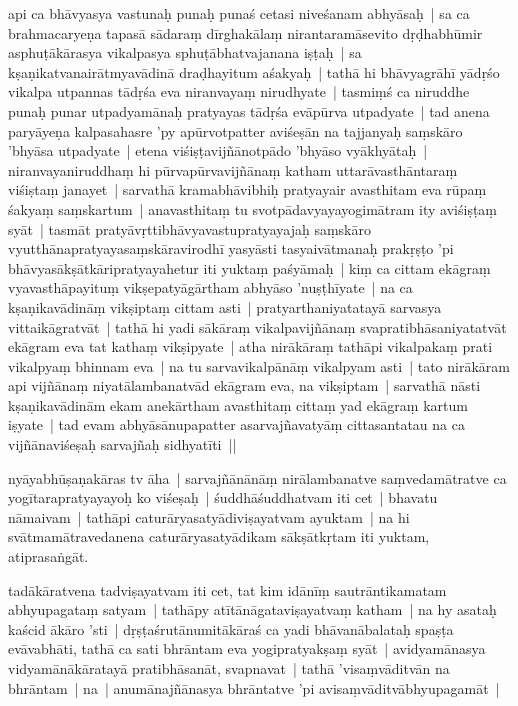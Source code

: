 \documentclass[article,12pt,a4paper]{memoir}%
\newcounter{parCount}
\begin{document}
	  \pstart \leavevmode%
	\label{thakur75-15.9}api ca bhāvyasya vastunaḥ punaḥ punaś cetasi niveśanam abhyāsaḥ | sa ca brahmacaryeṇa tapasā sādaraṃ dīrghakālaṃ nirantaramāsevito dṛḍhabhūmir asphuṭākārasya vikalpasya sphuṭābhatvajanana iṣṭaḥ | sa kṣaṇikatvanairātmyavādinā draḍhayitum aśakyaḥ | tathā hi bhāvyagrāhī yādṛśo vikalpa utpannas tādṛśa eva niranvayaṃ nirudhyate | tasmiṃś ca niruddhe punaḥ punar utpadyamānaḥ pratyayas tādṛśa evāpūrva utpadyate | tad anena paryāyeṇa kalpasahasre 'py apūrvotpatter aviśeṣān na tajjanyaḥ saṃskāro 'bhyāsa utpadyate | etena viśiṣṭavijñānotpādo 'bhyāso vyākhyātaḥ | niranvayaniruddhaṃ hi pūrvapūrvavijñānaṃ katham uttarāvasthāntaraṃ viśiṣtaṃ janayet | sarvathā kramabhāvibhiḥ pratyayair avasthitam eva rūpaṃ śakyaṃ saṃskartum | anavasthitaṃ tu svotpādavyayayogimātram ity aviśiṣṭaṃ syāt | tasmāt pratyāvṛttibhāvyavastupratyayajaḥ saṃskāro vyutthānapratyayasaṃskāravirodhī yasyāsti tasyaivātmanaḥ prakṛṣṭo 'pi bhāvyasākṣātkāripratyayahetur iti yuktaṃ paśyāmaḥ | kiṃ ca cittam ekāgraṃ vyavasthāpayituṃ vikṣepatyāgārtham abhyāso 'nuṣṭhīyate | na ca kṣaṇikavādināṃ vikṣiptaṃ cittam asti | pratyarthaniyatatayā sarvasya vittaikāgratvāt | tathā hi yadi sākāraṃ vikalpavijñānaṃ svapratibhāsaniyatatvāt ekāgram eva tat kathaṃ vikṣipyate | atha nirākāraṃ tathāpi vikalpakaṃ prati vikalpyaṃ bhinnam eva | na tu sarvavikalpānāṃ vikalpyam asti | tato nirākāram api vijñānaṃ niyatālambanatvād ekāgram eva, na vikṣiptam | sarvathā nāsti kṣaṇikavādinām ekam anekārtham avasthitaṃ cittaṃ yad ekāgraṃ kartum iṣyate | tad evam abhyāsānupapatter asarvajñavatyāṃ cittasantatau na ca vijñānaviśeṣaḥ sarvajñaḥ sidhyatīti || 
	{}
	\pend%
      

	  \pstart \leavevmode%
	\label{thakur75-15.30}nyāyabhūṣaṇakāras tv āha | sarvajñānānāṃ nirālambanatve saṃvedamātratve ca yogītarapratyayayoḥ ko viśeṣaḥ | śuddhāśuddhatvam iti cet | bhavatu nāmaivam | tathāpi caturāryasatyādiviṣayatvam ayuktam | na hi svātmamātravedanena caturāryasatyādikam sākṣātkṛtam iti yuktam, atiprasaṅgāt. 
	{}
	\pend%
      

	  \pstart \leavevmode%
	\label{thakur75-16.1}tadākāratvena tadviṣayatvam iti cet, tat kim idānīṃ sautrāntikamatam abhyupagataṃ satyam | tathāpy atītānāgataviṣayatvaṃ katham | na hy asataḥ kaścid ākāro 'sti | dṛṣṭaśrutānumitākāraś ca yadi bhāvanābalataḥ spaṣṭa evāvabhāti, tathā ca sati bhrāntam eva yogipratyakṣaṃ syāt | avidyamānasya vidyamānākāratayā pratibhāsanāt, svapnavat | tathā 'visaṃvāditvān na bhrāntam | na | anumānajñānasya bhrāntatve 'pi avisaṃvāditvābhyupagamāt | 
	{}
	\pend%
      
\end{document}
